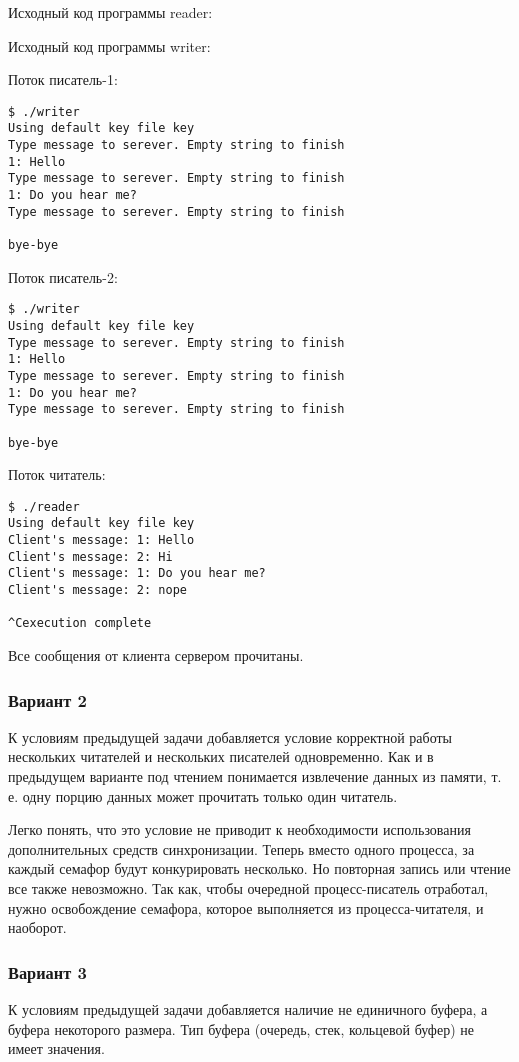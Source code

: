\documentclass[a4paper]{article}
\begin{document}
	Исходный код программы reader:
	
		
	Исходный код программы writer:
	
	
	Поток писатель-1:
	\begin{lstlisting}[style=crs_bash]
$ ./writer 
Using default key file key
Type message to serever. Empty string to finish
1: Hello 
Type message to serever. Empty string to finish
1: Do you hear me?
Type message to serever. Empty string to finish

bye-bye
	\end{lstlisting}
	
	Поток писатель-2:
	\begin{lstlisting}[style=crs_bash]
$ ./writer 
Using default key file key
Type message to serever. Empty string to finish
1: Hello 
Type message to serever. Empty string to finish
1: Do you hear me?
Type message to serever. Empty string to finish

bye-bye
	\end{lstlisting}
	
	Поток читатель:
	\begin{lstlisting}[style=crs_bash]
$ ./reader 
Using default key file key
Client's message: 1: Hello
Client's message: 2: Hi
Client's message: 1: Do you hear me?
Client's message: 2: nope

^Cexecution complete
	\end{lstlisting}
	
	Все сообщения от клиента сервером прочитаны.
	
	\subsubsection{Вариант 2}
	К условиям предыдущей задачи добавляется условие корректной работы нескольких читателей и нескольких писателей одновременно. Как и в предыдущем варианте под чтением понимается извлечение данных из памяти, т. е. одну порцию данных может прочитать только один читатель.

	Легко понять, что это условие не приводит к необходимости использования дополнительных средств синхронизации. Теперь вместо одного процесса, за каждый семафор будут конкурировать несколько. Но повторная запись или чтение все также невозможно. Так как, чтобы очередной процесс-писатель отработал, нужно освобождение семафора, которое выполняется из процесса-читателя, и наоборот.
	
	\subsubsection{Вариант 3}	
	К условиям предыдущей задачи добавляется наличие не единичного буфера, а буфера некоторого размера. Тип буфера (очередь, стек, кольцевой буфер) не имеет значения.
	
\end{document}
